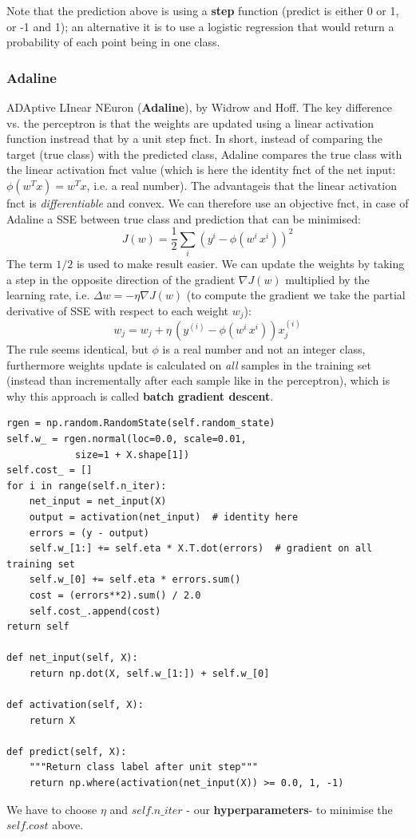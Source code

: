\documentclass[11pt]{article}
\begin{document}
Note that the prediction above is using a \textbf{step} function (predict is either 0 or 1, or -1 and 1); an alternative it is to use a logistic regression that would return a probability of each point being in one class.

\subsubsection*{Adaline}
ADAptive LInear NEuron (\textbf{Adaline}), by Widrow and Hoff. The key difference vs. the perceptron is that the weights are updated using a linear activation function instread that by a unit step fnct. In short, instead of comparing the target (true class) with the predicted class, Adaline compares the true class with the linear activation fnct value (which is here the identity fnct of the net input: $\phi(w^T x) = w^T x$, i.e. a real number). The advantageis that the linear activation fnct is \textit{differentiable} and convex. We can therefore use an objective fnct, in case of Adaline a SSE between true class and prediction that can be minimised:
\[ J(w) = \frac{1}{2} \sum_i (y^i - \phi(w^i \, x^i))^2
\] 
The term $1/2$ is used to make result easier. We can update the weights by taking a step in the opposite direction of the gradient $\nabla J(w)$ multiplied by the learning rate, i.e. $\Delta w = -\eta \nabla J(w)$ (to compute the gradient we take the partial derivative of SSE with respect to each weight $w_j$):
\[ 
w_j = w_j +   \eta \, (y^{(i)} - \phi(w^i \, x^i)) x_j^{(i)}
\]
The rule seems identical, but $\phi$ is a real number and not an integer class, furthermore weights update is calculated on \textit{all} samples in the training set (instead than incrementally after each sample like in the perceptron), which is why this approach is called \textbf{batch gradient descent}.

\begin{lstlisting}
rgen = np.random.RandomState(self.random_state)
self.w_ = rgen.normal(loc=0.0, scale=0.01,
			size=1 + X.shape[1])
self.cost_ = []
for i in range(self.n_iter):
	net_input = net_input(X)
	output = activation(net_input)  # identity here
	errors = (y - output)
	self.w_[1:] += self.eta * X.T.dot(errors)  # gradient on all training set
	self.w_[0] += self.eta * errors.sum()  
	cost = (errors**2).sum() / 2.0
	self.cost_.append(cost)
return self

def net_input(self, X):
    return np.dot(X, self.w_[1:]) + self.w_[0]

def activation(self, X):
    return X

def predict(self, X):
    """Return class label after unit step"""
    return np.where(activation(net_input(X)) >= 0.0, 1, -1)
\end{lstlisting}
We have to choose $\eta$ and $self.n\_iter$ - our \textbf{hyperparameters}- to minimise the $self.cost$ above.
\end{document}
